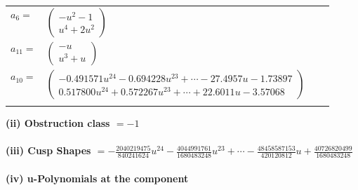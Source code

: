 \documentclass[1p]{elsarticle_modified}
\theoremstyle{definition}
\begin{document}
\begin{tabular}{m{7pt} m{180pt} m{7pt} m{180pt} }
\flushright $a_{6}=$&$\begin{pmatrix}- u^2-1\\u^4+2 u^2\end{pmatrix}$ \\
\flushright $a_{11}=$&$\begin{pmatrix}- u\\u^3+u\end{pmatrix}$ \\
\flushright $a_{10}=$&$\begin{pmatrix}-0.491571 u^{24}-0.694228 u^{23}+\cdots-27.4957 u-1.73897\\0.517800 u^{24}+0.572267 u^{23}+\cdots+22.6011 u-3.57068\end{pmatrix}$\\&\end{tabular}
\flushleft \textbf{(ii) Obstruction class $= -1$}\\~\\
\flushleft \textbf{(iii) Cusp Shapes $= -\frac{2040219475}{840241624} u^{24}-\frac{4044991761}{1680483248} u^{23}+\cdots-\frac{48458587153}{420120812} u+\frac{40726820499}{1680483248}$}\\~\\
\newpage\renewcommand{\arraystretch}{1}
\flushleft \textbf{(iv) u-Polynomials at the component}\newline \\
\end{document}
